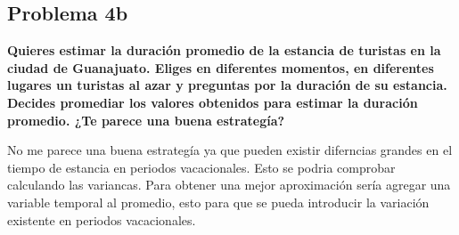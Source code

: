 \subsection*{Problema 4b}
\textbf{Quieres estimar la duración promedio de la estancia de turistas en la ciudad de Guanajuato. Eliges en diferentes momentos, en diferentes lugares un turistas al azar y preguntas por la duración de su estancia. Decides promediar los valores obtenidos para estimar la duración promedio. ¿Te parece una buena estrategía?}

No me parece una buena estrategía ya que pueden existir diferncias grandes en el tiempo de estancia en periodos vacacionales. Esto se podria comprobar calculando las variancas. Para obtener una mejor aproximación sería agregar una variable temporal al promedio, esto para que se pueda introducir la variación existente en periodos vacacionales.